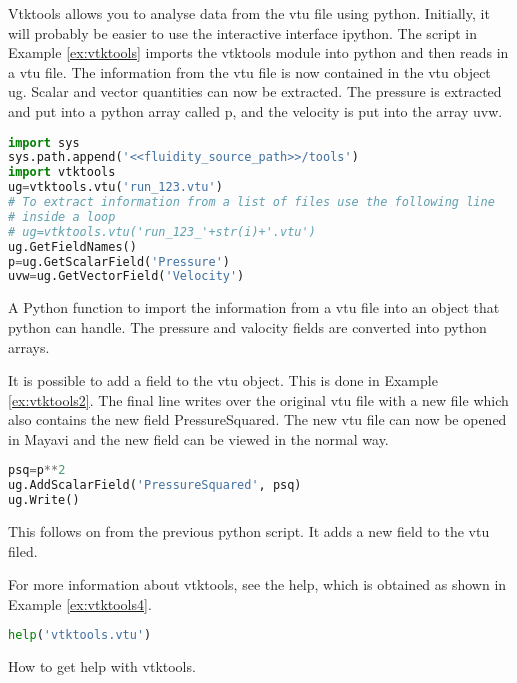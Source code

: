 Vtktools allows you to analyse data from the vtu file using python. Initially, it will probably be easier to use the interactive interface ipython.  The script in Example \ref{ex:vtktools} imports the vtktools module into python and then reads in a  vtu file.  The information from the vtu file is now contained in the vtu object ug. Scalar and vector quantities can now be extracted. The pressure is extracted and put into a python array called p, and the velocity is put into the array uvw. 
\begin{example}
  \begin{lstlisting}[language=Python]
import sys
sys.path.append('<<fluidity_source_path>>/tools')
import vtktools
ug=vtktools.vtu('run_123.vtu')
# To extract information from a list of files use the following line 
# inside a loop
# ug=vtktools.vtu('run_123_'+str(i)+'.vtu')
ug.GetFieldNames()
p=ug.GetScalarField('Pressure')
uvw=ug.GetVectorField('Velocity')
  \end{lstlisting}
  \caption{A Python function to import the information from a vtu file into an object that python can handle. The pressure and valocity fields are converted into python arrays.}
  \label{ex:vtktools}
\end{example}

It is possible to add a field to the vtu object. This is done in Example \ref{ex:vtktools2}. The final line writes over the original vtu file with a new file which also contains the new field PressureSquared. The new vtu file can now be opened in Mayavi and the new field can be viewed in the normal way.  
\begin{example}
  \begin{lstlisting}[language=Python]
psq=p**2
ug.AddScalarField('PressureSquared', psq)
ug.Write()
\end{lstlisting}
  \caption{This follows on from the previous python script. It adds a new field to the vtu filed. }
\label{ex:vtktools2}
\end{example}
For more information about vtktools, see the help, which is obtained as shown in Example \ref{ex:vtktools4}.
\begin{example}
  \begin{lstlisting}[language=Python]
help('vtktools.vtu')  
\end{lstlisting}
\caption{How to get help with vtktools.}
  \label{ex:vtktools4}
\end{example}


